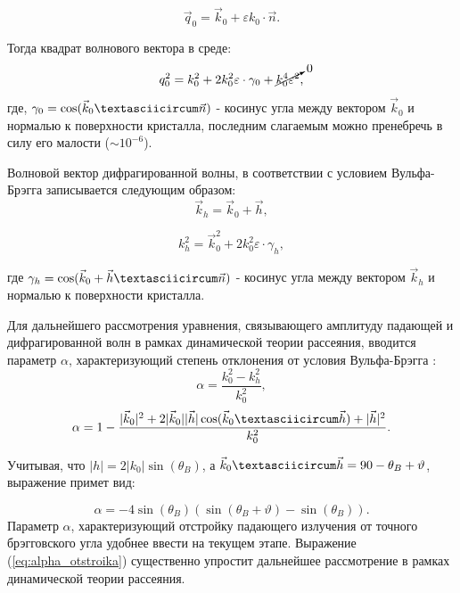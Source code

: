  \begin{equation}
   \vec{q}_0 = \vec{k}_0 + \varepsilon k_0 \cdot \vec{n}.
  \end{equation}

Тогда квадрат волнового вектора в среде:
\begin{equation}
   q_0^2 = k_0^2 + 2k_0^2 \varepsilon \cdot \gamma_0 + \cancelto{0}{k_0^4  \varepsilon^2},
   \label{eq:k_0_squred}
 \end{equation}
\noindent
где, $\gamma_0 = \cos(\vec{k}_0 \textasciicircum \vec{n})$ - косинус угла между вектором $\vec{k}_0$ и нормалью к поверхности кристалла,
последним слагаемым можно пренебречь в силу его малости ($\sim 10^{-6}$).

  Волновой вектор дифрагированной волны, в соответствии с условием Вульфа-Брэгга записывается следующим образом:
  $$\vec{k}_h = \vec{k}_0+\vec{h},$$

  \begin{equation}
     k_h^2 = \vec{k}_0^2+2k_0^2 \varepsilon \cdot \gamma_h,
     \label{eq:k_h_squred}
   \end{equation}
\noindent

где $\gamma_h = \cos(\vec{k}_0+ \vec{h} \textasciicircum \vec{n})$ - косинус угла между вектором $\vec{k}_h$ и нормалью к поверхности кристалла.

Для дальнейшего рассмотрения уравнения, связывающего амплитуду падающей и дифрагированной волн в рамках
динамической теории рассеяния, вводится параметр $\alpha$,
характеризующий степень отклонения от условия Вульфа-Брэгга \cite{Bushuev_Oreshko_2002}:
\begin{equation}
   \alpha = \frac{k_0^2-k_h^2}{k_0^2},
   \label{eq:alpha}
\end{equation}
$$  \alpha = 1 - \frac{|\vec{k}_0|^2+2|\vec{k}_0||\vec{h}|\cos(\vec{k}_0 \textasciicircum \vec{h})+|\vec{h}|^2}{k_0^2}.$$

Учитывая, что $ |h| = 2|k_0| \sin(\theta_B) $, а $\vec{k}_0 \textasciicircum \vec{h} = 90-\theta_B+\vartheta$,
выражение примет вид:

\begin{equation}
   \alpha = -4\sin(\theta_B)(\sin(\theta_B+\vartheta)-\sin(\theta_B)).
   \label{eq:alpha_otstroika}
\end{equation}
\noindent
Параметр $\alpha$, характеризующий отстройку падающего излучения от точного брэгговского угла удобнее ввести на
текущем этапе. Выражение (\ref{eq:alpha_otstroika}) существенно упростит
 дальнейшее рассмотрение в рамках динамической теории рассеяния.
